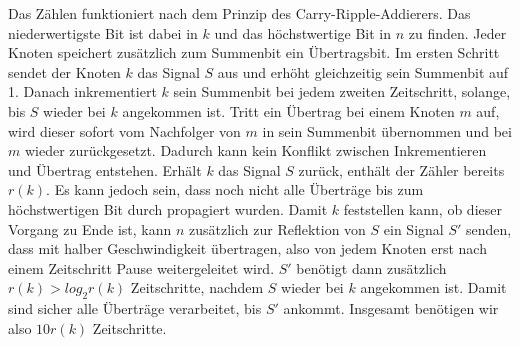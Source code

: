 \documentclass[11pt]{article}
\begin{document}
Das Zählen funktioniert nach dem Prinzip des Carry-Ripple-Addierers. 
Das niederwertigste Bit ist dabei in $k$ und das höchstwertige Bit in $n$ zu finden.
Jeder Knoten speichert zusätzlich zum Summenbit ein Übertragsbit. Im ersten Schritt sendet der Knoten $k$ das Signal $S$ aus und erhöht gleichzeitig sein Summenbit auf 1. Danach inkrementiert $k$ sein Summenbit bei jedem zweiten Zeitschritt, solange, bis $S$ wieder bei $k$ angekommen ist. 
Tritt ein Übertrag bei einem Knoten $m$ auf, wird dieser sofort vom Nachfolger von $m$ in sein Summenbit übernommen und bei $m$ wieder zurückgesetzt.
Dadurch kann kein Konflikt zwischen Inkrementieren und Übertrag entstehen.
Erhält $k$ das Signal $S$ zurück, enthält der Zähler bereits $r(k)$. 
Es kann jedoch sein, dass noch nicht alle Überträge bis zum höchstwertigen Bit durch propagiert wurden. 
Damit $k$ feststellen kann, ob dieser Vorgang zu Ende ist, kann $n$ zusätzlich zur Reflektion von $S$ ein Signal $S'$ senden, dass mit halber Geschwindigkeit übertragen, also von jedem Knoten erst nach einem Zeitschritt Pause weitergeleitet wird.
$S'$ benötigt dann zusätzlich $r(k) > log_2 r(k)$ Zeitschritte, nachdem $S$ wieder bei $k$ angekommen ist. 
Damit sind sicher alle Überträge verarbeitet, bis $S'$ ankommt.
Insgesamt benötigen wir also $10r(k)$ Zeitschritte.
\end{document}
